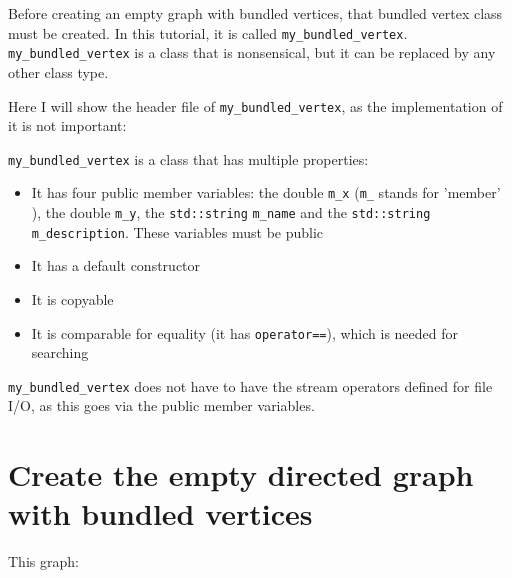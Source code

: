 Before creating an empty graph with bundled vertices, that bundled vertex
class must be created.
In this tutorial, it is called \verb;my_bundled_vertex;.
\verb;my_bundled_vertex; is a class that is nonsensical, but it can be replaced
by any other class type.

Here I will show the header file of \verb;my_bundled_vertex;, as the implementation
of it is not important:



\verb;my_bundled_vertex; is a class that has multiple properties: 

\begin{itemize}
  \item
    It has four public member variables: 
    the double \verb;m_x; 
    (\verb;m_;  stands for 'member' ), 
    the double \verb;m_y;, 
    the \verb;std::string; \verb;m_name; and the 
    \verb;std::string; \verb;m_description;.
    These variables must be public
  \item It has a default constructor
  \item It is copyable
  \item It is comparable for equality 
    (it has \verb;operator==;), 
    which is needed for searching
\end{itemize}

\verb;my_bundled_vertex; does not have to have the stream operators defined for
file I/O, as this goes via the public member variables.

\section{Create the empty directed graph with bundled vertices}
\label{subsec:create_empty_directed_bundled_vertices_graph}



This graph:

